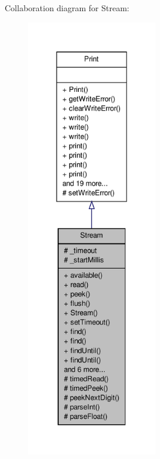 Collaboration diagram for Stream\-:
\nopagebreak
\begin{figure}[H]
\begin{center}
\leavevmode
\includegraphics[height=550pt]{class_stream__coll__graph}
\end{center}
\end{figure}
